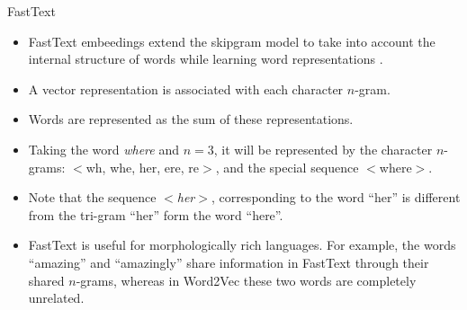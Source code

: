 \documentclass[handout]{beamer}
\begin{document}
\begin{frame}{FastText}
\begin{scriptsize}
\begin{itemize}
  
\item FastText embeedings extend the skipgram model to take into account the internal structure of words while learning word representations \cite{bojanowski2016enriching}.

\item A vector representation is associated with each character $n$-gram.

\item  Words are represented as the sum of these representations. 

\item Taking the word \emph{where} and $n = 3$, it will be represented by the character $n$-grams: $<$wh, whe, her, ere, re$>$, and the special sequence $<$where$>$.

\item Note that the sequence \emph{$<$her$>$}, corresponding to the word ``her'' is different from the tri-gram ``her'' form the word ``here''. 

\item FastText is useful for morphologically rich languages. For example, the words ``amazing'' and ``amazingly'' share information in FastText through their shared $n$-grams, whereas in Word2Vec these two words are completely unrelated.    
   
\end{itemize}
\end{scriptsize}
\end{frame}
\end{document}
